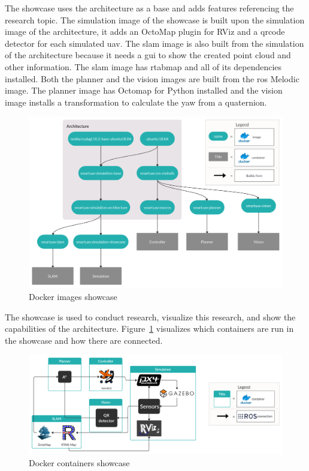 The showcase uses the architecture as a base and adds features referencing the research topic. The simulation image of the showcase is built upon the simulation image of the architecture, it adds an OctoMap plugin for RViz and a \acs{qrcode} detector for each simulated \acs{uav}. The \acs{slam} image is also built from the simulation of the architecture because it needs a \acs{gui} to show the created point cloud and other information. The \acs{slam} image has \acs{rtabmap} and all of its dependencies installed. Both the planner and the vision images are built from the \acs{ros} Melodic image. The planner image has Octomap for Python installed and the vision image installs a transformation to calculate the yaw from a quaternion.

\begin{figure}[!h]
  \centering
  \includegraphics[width=\linewidth]{images/showcase_images.png}
  \caption{Docker images showcase}
\end{figure}

\clearpage

The showcase is used to conduct research, visualize this research, and show the capabilities of the architecture. Figure~\ref{fig:showcase_containers} visualizes which containers are run in the showcase and how there are connected.

\begin{figure}[!h]
  \centering
  \includegraphics[width=\linewidth]{images/showcase_containers.png}
  \caption{Docker containers showcase}
  \label{fig:showcase_containers}
\end{figure}